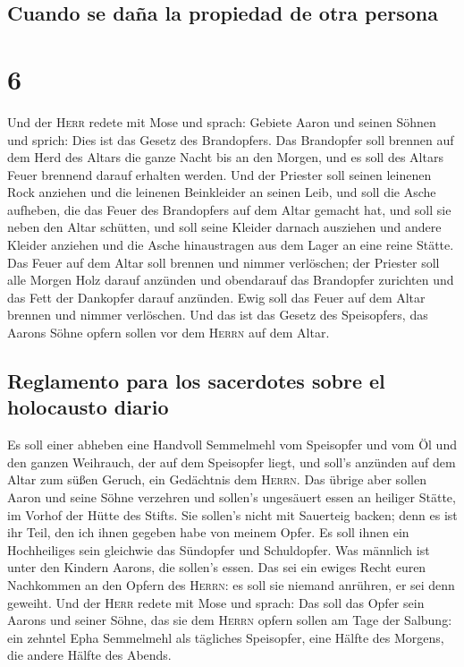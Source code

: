 \hypertarget{cuando-se-dauxf1a-la-propiedad-de-otra-persona}{%
\subsection{Cuando se daña la propiedad de otra
persona}\label{cuando-se-dauxf1a-la-propiedad-de-otra-persona}}

\hypertarget{section-5}{%
\section{6}\label{section-5}}

 Und der \textsc{Herr} redete mit Mose und sprach:
 Gebiete Aaron und seinen Söhnen und sprich: Dies ist das
Gesetz des Brandopfers. Das Brandopfer soll brennen auf dem Herd des
Altars die ganze Nacht bis an den Morgen, und es soll des Altars Feuer
brennend darauf erhalten werden.  Und der Priester soll
seinen leinenen Rock anziehen und die leinenen Beinkleider an seinen
Leib, und soll die Asche aufheben, die das Feuer des Brandopfers auf dem
Altar gemacht hat, und soll sie neben den Altar schütten, 
und soll seine Kleider darnach ausziehen und andere Kleider anziehen und
die Asche hinaustragen aus dem Lager an eine reine Stätte.
 Das Feuer auf dem Altar soll brennen und nimmer
verlöschen; der Priester soll alle Morgen Holz darauf anzünden und
obendarauf das Brandopfer zurichten und das Fett der Dankopfer darauf
anzünden.  Ewig soll das Feuer auf dem Altar brennen und
nimmer verlöschen.  Und das ist das Gesetz des
Speisopfers, das Aarons Söhne opfern sollen vor dem \textsc{Herrn} auf
dem Altar.

\hypertarget{reglamento-para-los-sacerdotes-sobre-el-holocausto-diario}{%
\subsection{Reglamento para los sacerdotes sobre el holocausto
diario}\label{reglamento-para-los-sacerdotes-sobre-el-holocausto-diario}}

 Es soll einer abheben eine Handvoll Semmelmehl vom
Speisopfer und vom Öl und den ganzen Weihrauch, der auf dem Speisopfer
liegt, und soll's anzünden auf dem Altar zum süßen Geruch, ein
Gedächtnis dem \textsc{Herrn}.  Das übrige aber sollen
Aaron und seine Söhne verzehren und sollen's ungesäuert essen an
heiliger Stätte, im Vorhof der Hütte des Stifts.  Sie
sollen's nicht mit Sauerteig backen; denn es ist ihr Teil, den ich ihnen
gegeben habe von meinem Opfer. Es soll ihnen ein Hochheiliges sein
gleichwie das Sündopfer und Schuldopfer.  Was männlich
ist unter den Kindern Aarons, die sollen's essen. Das sei ein ewiges
Recht euren Nachkommen an den Opfern des \textsc{Herrn}: es soll sie
niemand anrühren, er sei denn geweiht.  Und der
\textsc{Herr} redete mit Mose und sprach:  Das soll das
Opfer sein Aarons und seiner Söhne, das sie dem \textsc{Herrn} opfern
sollen am Tage der Salbung: ein zehntel Epha Semmelmehl als tägliches
Speisopfer, eine Hälfte des Morgens, die andere Hälfte des Abends.

